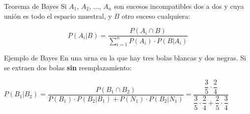 \documentclass[11pt]{beamer}
\begin{document}
\begin{frame}{Teorema de Bayes}
Si $A_1$, $A_2$, ..., $A_n$   son sucesos incompatibles dos a dos y cuya unión es todo el espacio muestral, y $B$ otro suceso cualquiera:
\begin{block}{}
$$P(A_i|B)=\dfrac{P(A_i \cap B)}{\sum_{i=1}^n P(A_i)\cdot  P(B|A_i)} $$
\end{block}
\end{frame}

\begin{frame}{Ejemplo de Bayes}
En una urna en la que hay tres bolas blancas y dos negras. Si se extraen dos bolas \textbf{sin} reemplazamiento:

\pause 
$P(B_1|B_2)=\dfrac{P(B_1 \cap B_2)}{P(B_1)\cdot  P(B_2|B_1)+P(N_1)\cdot  P(B_2|N_1)}=\dfrac{\dfrac{3}{5}\cdot\dfrac{2}{4}}{\dfrac{3}{5}\cdot\dfrac{2}{4} + \dfrac{2}{5}\cdot\dfrac{3}{4}}$
\end{frame}
\end{document}
